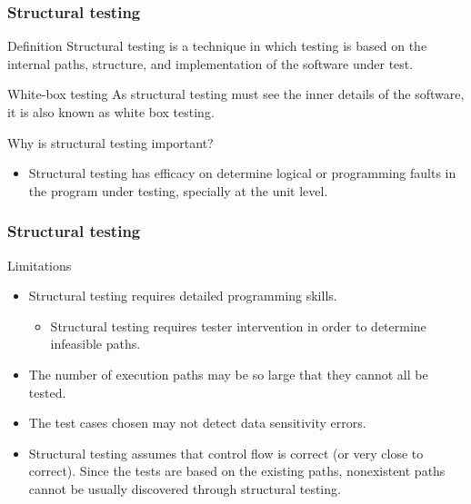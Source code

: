 \begin{frame}[parent={cmap:structural-software-testing},hasnext=true,hasprev=true]
\frametitle{Structural testing}
\label{concept:structural-testing}

\begin{block:concept}{Definition}
Structural testing is a technique in which testing is based on the
internal paths, structure, and implementation of the software under test.
\end{block:concept}

\begin{block:fact}{White-box testing}
As structural testing must see the inner details of the software, it is also
known as white box testing.
\end{block:fact}

\begin{block:fact}{Why is structural testing important?}
\begin{itemize}
	\item Structural testing has efficacy on determine logical or programming
	faults in the program under testing, specially at the unit level.
\end{itemize}
\end{block:fact}
\end{frame}


\begin{frame}
\frametitle{Structural testing}

\begin{block:concept}{Limitations}
\begin{itemize}
	\item Structural testing requires detailed programming skills.
	\begin{itemize}
		\item Structural testing requires tester intervention in order to
		determine infeasible paths.
	\end{itemize}

	\item The number of execution paths may be so large that they cannot all be
	tested.

	\item The test cases chosen may not detect data sensitivity errors.

	\item Structural testing assumes that control flow is correct (or very
	close to correct). Since the tests are based on the existing paths, nonexistent
	paths cannot be usually discovered through structural testing.
\end{itemize}
\end{block:concept}
\end{frame}


